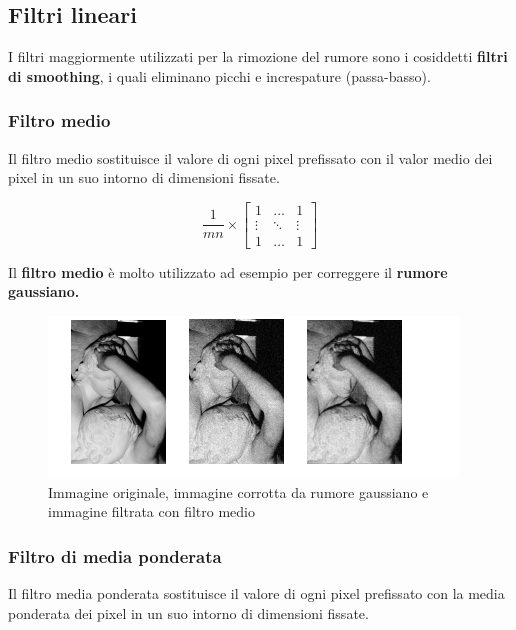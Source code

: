 \subsection{Filtri lineari}

I filtri maggiormente utilizzati per la rimozione del rumore sono i cosiddetti
\textbf{filtri di smoothing}, i quali eliminano picchi e increspature
(passa-basso).

\subsubsection{Filtro medio}
Il filtro medio sostituisce il valore di ogni pixel prefissato con il valor
medio dei pixel in un suo intorno di dimensioni fissate.

\[
    \frac{1}{mn} \times
    \begin{bmatrix}
        1      & \ldots & 1      \\
        \vdots & \ddots & \vdots \\
        1      & \ldots & 1
    \end{bmatrix}
\]

Il \textbf{filtro medio} è molto utilizzato ad esempio per correggere il
\textbf{rumore gaussiano.}

\begin{figure}[H]
    \centering
    \includegraphics[width=\linewidth, keepaspectratio]{capitoli/immagini/imgs/filtro-medio-esempio2.png}
    \caption{Immagine originale, immagine corrotta da rumore gaussiano e immagine filtrata con filtro medio}
\end{figure}

\subsubsection{Filtro di media ponderata}
Il filtro media ponderata sostituisce il valore di ogni pixel prefissato con la
media ponderata dei pixel in un suo intorno di dimensioni fissate.

